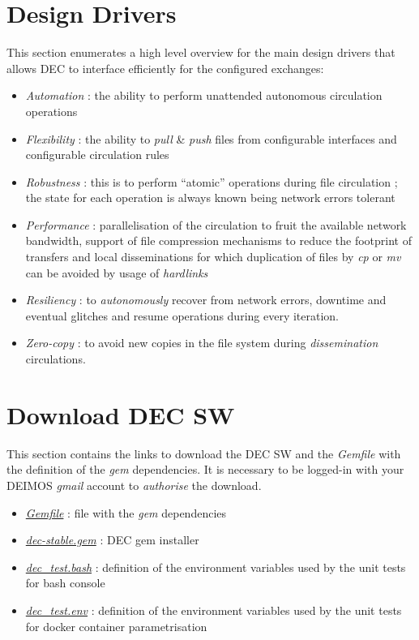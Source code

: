 \documentclass[dec_sum_main.tex]{subfiles}
\begin{document}
\section{Design Drivers}
This section enumerates a high level overview for the main design drivers that allows DEC to interface efficiently for the configured exchanges:

\begin{itemize}
	\item \textit{Automation} : the ability to perform unattended autonomous circulation operations
	\item \textit{Flexibility} : the ability to \textit{pull} \& \textit{push} files from configurable interfaces and configurable circulation rules
	\item \textit{Robustness} : this is to perform “atomic” operations during file circulation ; the state for each operation is always known being network errors tolerant
	\item \textit{Performance} : parallelisation of the circulation to fruit the available network bandwidth, support of file compression mechanisms to reduce the footprint of transfers and local disseminations for which duplication of files by \textit{cp} or \textit{mv} can be avoided by usage of \textit{hardlinks}
	\item \textit{Resiliency} : to \textit{autonomously} recover from network errors, downtime and eventual glitches and resume operations during every iteration.
	\item \textit{Zero-copy} : to avoid new copies in the file system during \textit{dissemination} circulations.	
\end{itemize}

\section{Download DEC SW}
This section contains the links to download the DEC SW and the \textit{Gemfile} with the definition of the \textit{gem} dependencies. It is necessary to be logged-in with your DEIMOS \textit{gmail} account to \textit{authorise} the download.

\par
\noindent

\begin{itemize}
	\item \href{https://drive.google.com/uc?export=download&id=18TAD2BAJpHzgBdZGf3W8KQZCY7SPpKbU}{\textit{Gemfile}} : file with the \textit{gem} dependencies 
	\item \href{https://drive.google.com/uc?export=download&id=1gieDRpDEBzKv5Xr0qwPvBz34RHphTnQq}{\textit{dec-stable.gem}} : DEC gem installer
	\item\href{https://drive.google.com/uc?export=download&id=1JBAnxdRwaPK8PmrxuRi3qea43NOPRJbK/view?usp=sharing}{\textit{dec\_test.bash}} : definition of the environment variables used by the unit tests for bash console 
	\item\href{https://drive.google.com/uc?export=download&id=1HHWOVxCZbY6Surv_kKyF5kGTy45CvUKl/view?usp=sharing}{\textit{dec\_test.env}} : definition of the environment variables used by the unit tests for docker container parametrisation
\end{itemize}
\end{document}
